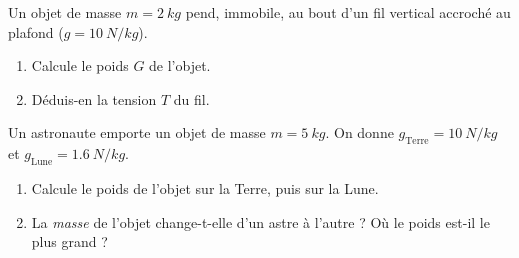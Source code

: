 \documentclass[11pt,a4paper]{article}
\newcommand{\vv}[1]{\vec{#1}}\newcommand{\ds}{\displaystyle}
\begin{document}
\begin{exo}
Un objet de masse $m=\qty{2}{kg}$ pend, immobile, au bout d'un fil vertical accroché au plafond
($g=\qty{10}{N/kg}$).
\begin{center}
\end{center}
\begin{enumerate}[label=\alph*)]
  \item Calcule le poids $G$ de l'objet.
  \item Déduis-en la tension $T$ du fil.
\end{enumerate}
\end{exo}

\begin{exo}
Un astronaute emporte un objet de masse $m=\qty{5}{kg}$. On donne $g_{\text{Terre}}=\qty{10}{N/kg}$
et $g_{\text{Lune}}=\qty{1.6}{N/kg}$.
\begin{enumerate}[label=\alph*)]
  \item Calcule le poids de l'objet sur la Terre, puis sur la Lune.
  \item La \emph{masse} de l'objet change-t-elle d'un astre à l'autre ? Où le poids est-il le plus grand ?
\end{enumerate}
\end{exo}
\end{document}
